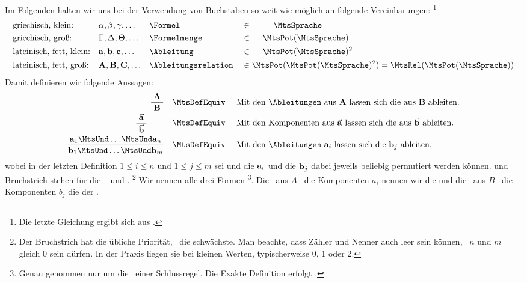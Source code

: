 %
Im Folgenden halten wir uns bei der Verwendung von Buchstaben so weit wie möglich an folgende Vereinbarungen:%
\footnote{Die letzte Gleichung ergibt sich aus .}
\begin{align}
	&  \text{griechisch, klein:}       && \alpha, \beta, \gamma, \dots
	&& \text{\Formel}                  && \in \qquad \; \; \MtsSprache
	\\
	&  \text{griechisch, groß:}        && \Gamma, \Delta, \Theta, \dots
	&& \text{\Formelmenge}             && \in \quad \; \MtsPotSprache
	\\
	&  \text{lateinisch, fett, klein:} && \drvft{a}, \drvft{b}, \drvft{c}, \dots
	&& \text{\Ableitung}               && \in \quad \; \MtsAllDerive
	\\
	&  \text{lateinisch, fett, groß:}  && \Drvft{A}, \Drvft{B}, \Drvft{C}, \dots
	&& \text{\Ableitungsrelation}      && \in \MtsPotAllDerive = \MtsRelAllDerive
\end{align}
Damit definieren wir folgende Aussagen:
\begin{align}
	\frac{\; \Drvft{A}  \;}{\; \Drvft{B} \;}
	& \quad \MtsDefEquiv \quad
	\text{ Mit den \Ableitungen\ aus $\Drvft{A}$ lassen sich die aus $\Drvft{B}$ ableiten.}
	\label{def:AB}
	\\
	\frac{\; \vec{\drvft{a}} \;}{\; \vec{\drvft{b}} \;} \qquad
	& \quad \MtsDefEquiv \quad
	\text{ Mit den Komponenten aus $\vec{\drvft{a}}$ lassen sich die aus $\vec{\drvft{b}}$ ableiten.}
	\label{def:ab}
	\\
	\frac{\drvft{a}_1 \MtsUnd \dots \MtsUnd \drvft{a}_n}{\drvft{b}_1 \MtsUnd \dots \MtsUnd \drvft{b}_m}
	& \quad \MtsDefEquiv \quad
	\text{ Mit den \Ableitungen\ $\drvft{a}_i$ lassen sich die $\drvft{b}_j$ ableiten.}
	\label{def:aabb}
\end{align}
wobei in der letzten Definition $1 \le i \le n$ und $1 \le j \le m$ sei und die $\mathbf{a}_i$ und die $\mathbf{b}_j$ dabei jeweils beliebig permutiert werden können.
 und Bruchstrich stehen für die \Metaoperationen\ \chrqt{\MtsAnd} und \chrqt{\MtsImp}.%
\footnote{%
	Der Bruchstrich hat die übliche Priorität, \MtsUnd\ die schwächste.
	Man beachte, dass Zähler und Nenner auch leer sein können, \textdh\ $n$ und $m$ gleich $0$ sein dürfen.
	In der Praxis liegen sie bei kleinen Werten, typischerweise 0, 1 oder 2.
}
Wir nennen alle drei Formen %
\footnote{%
	Genau genommen nur um die \Darstellung\ einer Schlussregel.
	Die Exakte Definition erfolgt .
}.
Die \Elemente\ aus $A$ \textbzw\ die Komponenten $a_i$ nennen wir die  und die \Elemente\ aus $B$ \textbzw\ die Komponenten $b_j$ die  der \Schlussregel.
